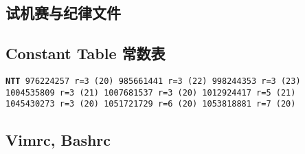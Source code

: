 \documentclass[titlepage, a4paper]{article}
\begin{document}
\begin{multicols}{2}
\begin{spacing}{0.6}
				\subsection{试机赛与纪律文件}
				\begin{spacing}{0.3}
					
				\end{spacing}
				\subsection{Constant Table 常数表}
				\label{randomprimes}
				\begin{small}
					\setlength{\parindent}{0em}\setlength{\parskip}{0em}\renewcommand{\baselinestretch}{.8}
					\texttt{}
					\texttt{\textbf{NTT} 976224257 r=3 (20)
					985661441 r=3 (22)
					998244353 r=3 (23)\\
					1004535809 r=3 (21)
					1007681537 r=3 (20)
					1012924417 r=5 (21)\\
					1045430273 r=3 (20)
					1051721729 r=6 (20)
					1053818881 r=7 (20)				
					}
				\end{small}
				
				\subsection*{Vimrc, Bashrc}
				\inputminted{vim}{src/Miscellany/vimrc}
				\inputminted{sh}{src/Miscellany/bashrc}
		
		\newpage

\end{spacing}
\end{multicols}
\end{document}
